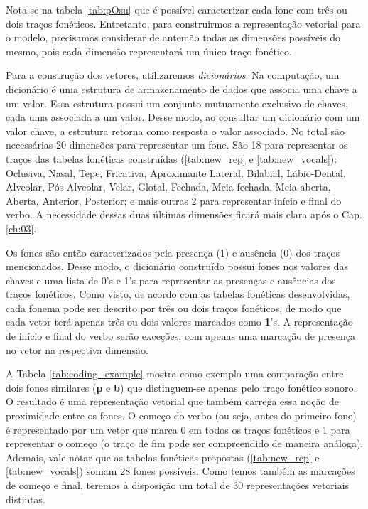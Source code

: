 Nota-se na tabela \ref{tab:pOsu} que é possível caracterizar cada fone com três ou dois traços fonéticos. Entretanto, para construirmos a representação vetorial para o modelo, precisamos considerar de antemão todas as dimensões possíveis do mesmo, pois cada dimensão representará um único traço fonético.  

Para a construção dos vetores, utilizaremos \textit{dicionários}. Na computação, um dicionário é uma estrutura de armazenamento de dados que associa uma chave a um valor. Essa estrutura possui um conjunto mutuamente exclusivo de chaves, cada uma associada a um valor. Desse modo, ao consultar um dicionário com um valor chave, a estrutura retorna como resposta o valor associado. No total são necessárias 20 dimensões para representar um fone. São 18 para representar os traços das tabelas fonéticas construídas (\ref{tab:new_rep} e \ref{tab:new_vocals}): Oclusiva, Nasal, Tepe, Fricativa, Aproximante Lateral, Bilabial, Lábio-Dental, Alveolar, Pós-Alveolar, Velar, Glotal, Fechada, Meia-fechada, Meia-aberta, Aberta, Anterior, Posterior; e mais outras 2 para representar início e final do verbo. A necessidade dessas duas últimas dimensões ficará mais clara após o Cap. \ref{ch:03}.

Os fones são então caracterizados pela presença (1) e ausência (0) dos traços mencionados. Desse modo, o dicionário construído possui fones nos valores das chaves e uma lista de 0's e 1's para representar as presenças e ausências dos traços fonéticos. Como visto, de acordo com as tabelas fonéticas desenvolvidas, cada fonema pode ser descrito por três ou dois traços fonéticos, de modo que cada vetor terá apenas três ou dois valores marcados como \textbf{1}'s. A representação de início e final do verbo serão exceções, com apenas uma marcação de presença no vetor na respectiva dimensão. 

A Tabela \ref{tab:coding_example} mostra como exemplo uma comparação entre dois fones similares (\textbf{p} e \textbf{b}) que distinguem-se apenas pelo traço fonético sonoro. O resultado é uma representação vetorial que também carrega essa noção de proximidade entre os fones. O começo do verbo (ou seja, antes do primeiro fone) é representado por um vetor que marca 0 em todos os traços fonéticos e 1 para representar o começo (o traço de fim pode ser compreendido de maneira análoga). Ademais, vale notar que as tabelas fonéticas propostas (\ref{tab:new_rep} e \ref{tab:new_vocals}) somam 28 fones possíveis. Como temos também as marcações de começo e final, teremos à disposição um total de 30 representações vetoriais distintas.

